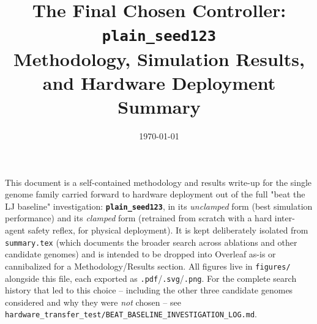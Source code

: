 \documentclass[11pt]{article}
\title{The Final Chosen Controller: \texttt{plain\_seed123}\\
\large Methodology, Simulation Results, and Hardware Deployment Summary}
\author{}
\date{\today}
\begin{document}
\maketitle

\noindent This document is a self-contained methodology and results write-up for the single
genome family carried forward to hardware deployment out of the full "beat the LJ baseline"
investigation: \textbf{\texttt{plain\_seed123}}, in its \emph{unclamped} form (best simulation
performance) and its \emph{clamped} form (retrained from scratch with a hard inter-agent
safety reflex, for physical deployment). It is kept deliberately isolated from
\texttt{summary.tex} (which documents the broader search across ablations and other
candidate genomes) and is intended to be dropped into Overleaf as-is or cannibalized for a
Methodology/Results section. All figures live in \texttt{figures/} alongside this file, each
exported as \texttt{.pdf}/\texttt{.svg}/\texttt{.png}. For the complete search history that
led to this choice -- including the other three candidate genomes considered and why they
were \emph{not} chosen -- see
\texttt{hardware\_transfer\_test/BEAT\_BASELINE\_INVESTIGATION\_LOG.md}.
\end{document}
